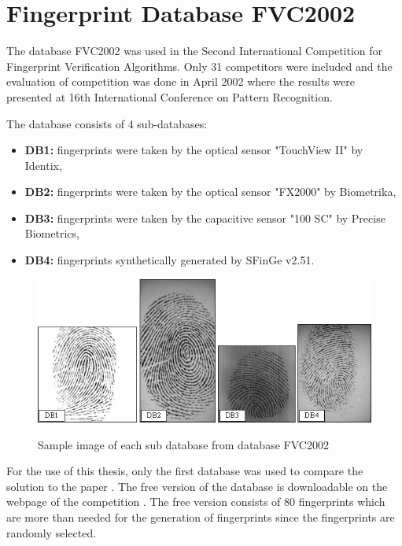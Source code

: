 \section{Fingerprint Database FVC2002}
The database FVC2002 was used in the Second International Competition for Fingerprint Verification Algorithms. Only 31 competitors were included and the evaluation of competition was done in April 2002 where the results were presented at 16th International Conference on Pattern Recognition. \cite{FVC2002S73:online}

The database consists of 4 sub-databases: \cite{FVC2002S73:online}
\begin{itemize}
	\item \textbf{DB1:} fingerprints were taken by the optical sensor "TouchView II" by Identix,
	\item \textbf{DB2:} fingerprints were taken by the optical sensor "FX2000" by Biometrika,
	\item \textbf{DB3:} fingerprints were taken by the capacitive sensor "100 SC" by Precise Biometrics,
	\item \textbf{DB4:} fingerprints synthetically generated by SFinGe v2.51.
\end{itemize}

\begin{figure}[H]
    \centering
        {\includegraphics[width=0.8\linewidth]{obrazky-figures/db_ex.png}}\\
        \caption{Sample image of each sub database from database FVC2002 \cite{FVC2002S73:online}}
        \label{fig:db_ex}
\end{figure}

For the use of this thesis, only the first database was used to compare the solution to the paper \cite{morphing_paper}. The free version of the database is downloadable on the webpage of the competition \cite{FVC2002S73:online}. The free version consists of 80 fingerprints which are more than needed for the generation of fingerprints since the fingerprints are randomly selected. 


